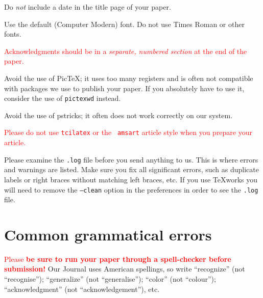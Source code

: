 \documentclass[12pt]{article}
\begin{document}
    Do {\it not\/} include a date in the title page of your paper.

    Use the default (Computer Modern) font.  Do not use Times Roman or
other fonts.

    \textcolor{red}{Acknowledgments should be in a {\it separate, numbered
section} at the end of the paper.}

Avoid the use of PicTeX; it uses too many registers and is often not
compatible with packages we use to publish your paper.  If you
absolutely have to use it, consider the use of {\tt pictexwd} instead.

Avoid the use of pstricks; it often does not work correctly on our system.

     \textcolor{red}{Please do not use {\tt tcilatex} or the {\tt
amsart} article style when you prepare your article.}

Please examine the {\tt .log} file before you send anything to us.
This is where errors and warnings are listed.   Make sure you 
fix all significant errors, such as duplicate labels or right braces
without matching left braces, etc.   If you use TeXworks
you will need to remove the {\tt --clean} option in the preferences
in order to see the {\tt .log} file.

\section{Common grammatical errors}

\textcolor{red}{Please {\bf be sure to run your paper through a spell-checker before
submission!}}  Our Journal uses American spellings, so write
``recognize'' (not ``recognise'');
``generalize'' (not ``generalise''); ``color'' (not ``colour'');
``acknowledgment'' (not ``acknowledgement''), etc.
\end{document}
